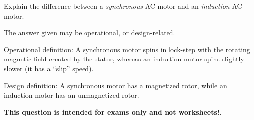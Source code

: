 

Explain the difference between a {\it synchronous} AC motor and an {\it induction} AC motor.

\vskip 100pt







The answer given may be operational, or design-related.

\vskip 10pt

Operational definition: A synchronous motor spins in lock-step with the rotating magnetic field created by the stator, whereas an induction motor spins slightly slower (it has a ``slip'' speed).

\vskip 10pt

Design definition: A synchronous motor has a magnetized rotor, while an induction motor has an unmagnetized rotor.







{\bf This question is intended for exams only and not worksheets!}.


